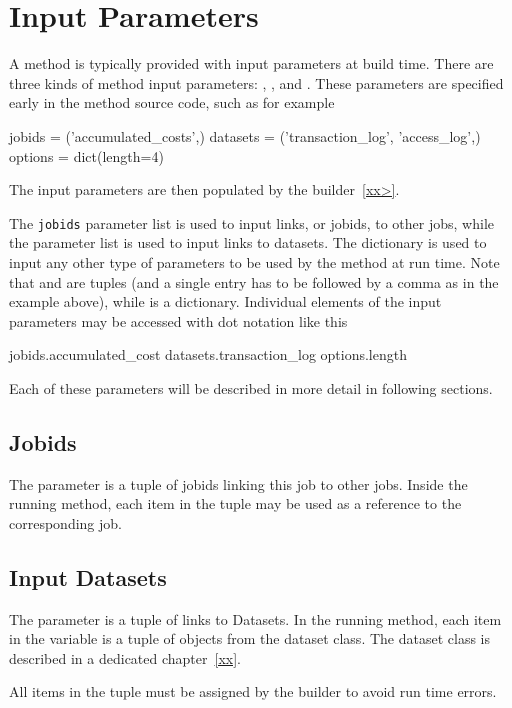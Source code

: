 \section{Input Parameters}
A method is typically provided with input parameters at build time.
There are three kinds of method input parameters: \jobids, \datasets,
and \options.  These parameters are specified early in the method
source code, such as for example
\begin{python}
jobids = ('accumulated_costs',)
datasets = ('transaction_log', 'access_log',)
options = dict(length=4)
\end{python}
The input parameters are then populated by the builder~\ref{xx>}.

The \texttt{jobids} parameter list is used to input links, or jobids,
to other jobs, while the \datasets parameter list is used to input
links to datasets. The \options dictionary is used to input any other
type of parameters to be used by the method at run time.  Note that
\jobids and \datasets are tuples (and a single entry has to be
followed by a comma as in the example above), while \options is a
dictionary.  Individual elements of the input parameters may be
accessed with dot notation like this
\begin{python}
jobids.accumulated_cost
datasets.transaction_log
options.length
\end{python}
Each of these parameters will be described in more detail in following
sections.




\subsection*{Jobids}
The \jobids parameter is a tuple of jobids linking this job to other
jobs.  Inside the running method, each item in the \jobids tuple may
be used as a reference to the corresponding job.




\subsection*{Input Datasets}
The \datasets parameter is a tuple of links to Datasets.  In the
running method, each item in the \datasets variable is a tuple of
objects from the dataset class.  The dataset class is described in a
dedicated chapter~\ref{xx}.

All items in the \datasets tuple must be assigned by the builder to
avoid run time errors.

